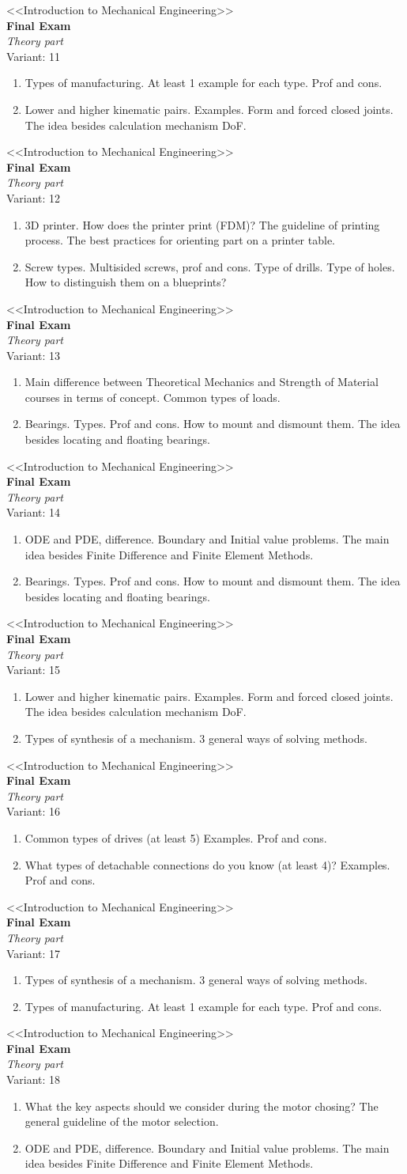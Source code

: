 \documentclass[12pt]{article}
\newcommand\ttask[2]{
	\begin{center}
		\LARGE <<Introduction to Mechanical Engineering>> \\ \textbf{Final Exam} \\ \textit{Theory part} \\ Variant: #1
	\end{center}
#2
}
\def\introTM{Lower and higher kinematic pairs. Examples. Form and forced closed joints. The idea besides calculation mechanism DoF.}
\def\typeD{Common types of drives (at least 5) Examples. Prof and cons.}
\def\SPM{Types of synthesis of a mechanism. 3 general ways of solving methods.}
\def\MS{What the key aspects should we consider during the motor chosing? The general guideline of the motor selection.}
\def\LJC{What types of detachable connections do you know (at least 4)? Examples. Prof and cons.}
\def\LJCCC{Bearings. Types. Prof and cons. How to mount and dismount them. The idea besides locating and floating bearings.}
\def\CD{Screw types. Multisided screws, prof and cons. Type of drills. Type of holes. How to distinguish them on a blueprints?}
\def\DTM{Types of manufacturing. At least 1 example for each type. Prof and cons.}
\def\BP{3D printer. How does the printer print (FDM)? The guideline of printing process. The best practices for orienting part on a printer table.}
\def\SoM{Main difference between Theoretical Mechanics and Strength of Material courses in terms of concept. Common types of loads.}
\def\FDM{ODE and PDE, difference. Boundary and Initial value problems. The main idea besides Finite Difference and Finite Element Methods.}
\begin{document}
\ttask{11}{\begin{enumerate}
	\item \DTM
	\item \introTM
\end{enumerate}}

\ttask{12}{\begin{enumerate}
	\item \BP
	\item \CD
\end{enumerate}}

\ttask{13}{\begin{enumerate}
	\item \SoM
	\item \LJCCC
\end{enumerate}}

\ttask{14}{\begin{enumerate}
	\item \FDM
	\item \LJCCC
\end{enumerate}}

\ttask{15}{\begin{enumerate}
	\item \introTM
	\item \SPM
\end{enumerate}}

\ttask{16}{\begin{enumerate}
	\item \typeD
	\item \LJC
\end{enumerate}}

\ttask{17}{\begin{enumerate}
	\item \SPM
	\item \DTM
\end{enumerate}}

\ttask{18}{\begin{enumerate}
	\item \MS
	\item \FDM
\end{enumerate}}
\end{document}

